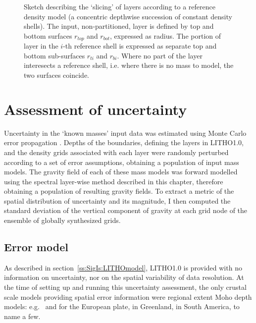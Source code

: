 \begin{figure}
    \begin{adjustbox}{center}
    \end{adjustbox}
    \caption[Sketch describing the `slicing' of layers according to a reference density model.]{
        Sketch describing the `slicing' of layers according to a reference density model (a concentric depthwise succession of constant density shells).
        The input, non-partitioned, layer is defined by top and bottom surfaces $r_{top}$ and $r_{bot}$, expressed as radius.
        The portion of layer in the $i$-th reference shell is expressed as separate top and bottom sub-surfaces $r_{ti}$ and $r_{bi}$.
        Where no part of the layer interesects a reference shell, i.e. where there is no mass to model, the two surfaces coincide.}
    \label{fig:SigIs:RefSlices}
\end{figure}

\FloatBarrier

\section{Assessment of uncertainty}
\label{s:SigIs:Impl}

Uncertainty in the `known masses' input data was estimated using Monte Carlo error propagation \parencite[][chapter 2.6]{Aster2018}.
Depths of the boundaries, defining the layers in {LITHO1.0}, and the density grids associated with each layer were randomly perturbed according to a set of error assumptions, obtaining a population of input mass models.
The gravity field of each of these mass models was forward modelled using the spectral layer-wise method described in this chapter, therefore obtaining a population of resulting gravity fields.
To extract a metric of the spatial distribution of uncertainty and its magnitude, I then computed the standard deviation of the vertical component of gravity at each grid node of the ensemble of globally synthesized grids.

\subsection{Error model}
\label{ss:SigIs:Impl:ErrorModel}

As described in section~\ref{ss:SigIs:LITHOmodel}, {LITHO1.0} is provided with no information on uncertainty, nor on the spatial variability of data resolution.
At the time of setting up and running this uncertainty assessment, the only crustal scale models providing spatial error information were regional extent Moho depth models: e.g.~\textcite{Grad2009} and \textcite{Artemieva2013} for the European plate, \textcite{Steffen2017} in Greenland, \textcite{VanderMeijde2013} in South America, to name a few.

